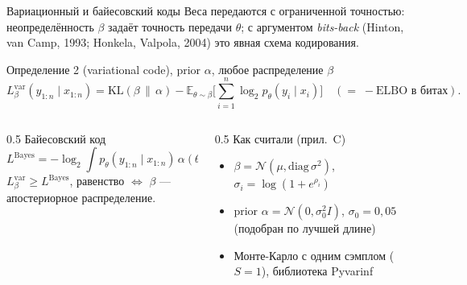 \documentclass[aspectratio=169,10pt]{beamer}
\newcommand{\E}{\mathbb{E}}
\newcommand{\KL}{\mathrm{KL}}
\newcommand{\yx}{y_{1:n}\mid x_{1:n}}
\begin{document}
\begin{frame}{Вариационный и байесовский коды}
  Веса передаются с ограниченной точностью: неопределённость $\beta$ задаёт точность передачи $\theta$; с аргументом \emph{bits-back} (Hinton, van Camp, 1993; Honkela, Valpola, 2004) это явная схема кодирования.
  \begin{block}{Определение 2 (variational code), prior $\alpha$, любое распределение $\beta$}
    \[
      L^{\mathrm{var}}_\beta(\yx)=\KL(\beta\,\|\,\alpha)-\E_{\theta\sim\beta}\Big[\sum_{i=1}^n\log_2p_\theta(y_i\mid x_i)\Big]
      \quad(=\;-\mathrm{ELBO}\text{ в битах}).
    \]
  \end{block}
  \begin{columns}[T]
    \begin{column}{0.5\textwidth}
      \textcolor{structure}{Байесовский код}
      \[
        L^{\mathrm{Bayes}}=-\log_2\!\int p_\theta(\yx)\,\alpha(\theta)\,d\theta,
      \]
      $L^{\mathrm{var}}_\beta\ge L^{\mathrm{Bayes}}$, равенство $\iff$ $\beta$ --- апостериорное распределение.
    \end{column}
    \begin{column}{0.5\textwidth}
      \textcolor{structure}{Как считали (прил.~C)}
      \begin{itemize}
        \item $\beta=\mathcal N(\mu,\mathrm{diag}\,\sigma^2)$, $\sigma_i=\log(1+e^{\rho_i})$
        \item prior $\alpha=\mathcal N(0,\sigma_0^2I)$, $\sigma_0=0{,}05$ (подобран по лучшей длине)
        \item Монте-Карло с одним сэмплом ($S=1$), библиотека Pyvarinf
      \end{itemize}
    \end{column}
  \end{columns}
\end{frame}
\end{document}
